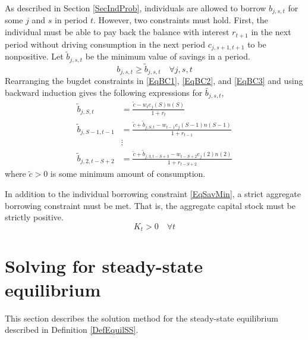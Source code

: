 \documentclass[letterpaper,12pt]{article}
\theoremstyle{definition}
\renewcommand\theenumi{\roman{enumi}}
\begin{document}
  As described in Section \ref{SecIndProb}, individuals are allowed to borrow $b_{j,s,t}$ for some $j$ and $s$ in period $t$. However, two constraints must hold. First, the individual must be able to pay back the balance with interest $r_{t+1}$ in the next period without driving consumption in the next period $c_{j,s+1,t+1}$ to be nonpositive. Let $\tilde{b}_{j,s,t}$ be the minimum value of savings in a period.
  \begin{equation}\label{EqSavMin}
    b_{j,s,t}\geq\tilde{b}_{j,s,t} \quad\forall j,s,t
  \end{equation}
  Rearranging the bugdet constraints in \eqref{EqBC1}, \eqref{EqBC2}, and \eqref{EqBC3} and using backward induction gives the following expressions for $\bar{b}_{j,s,t}$,
  \begin{equation}\label{EqBorConsts}
    \begin{split}
      \tilde{b}_{j,S,t} &= \frac{\tilde{c} - w_te_j(S)n(S)}{1+r_t}  \\
      \tilde{b}_{j,S-1,t-1} &= \frac{\tilde{c} + \tilde{b}_{j,S,t} - w_{t-1}e_j(S-1)n(S-1)}{1+r_{t-1}} \\
      &\vdots \\
      \tilde{b}_{j,2,t-S+2} &= \frac{\tilde{c} + \tilde{b}_{j,3,t-S+3} - w_{t-S+2}e_j(2)n(2)}{1+r_{t-S+2}}
    \end{split}
  \end{equation}
  where $\tilde{c}>0$ is some minimum amount of consumption.

  In addition to the individual borrowing constraint \eqref{EqSavMin}, a strict aggregate borrowing constraint must be met. That is, the aggregate capital stock must be strictly positive.
  \begin{equation}\label{EqAggrCapConstr}
    K_t > 0 \quad\forall t
  \end{equation}


\newpage
\section{Solving for steady-state equilibrium}\label{AppSSsolve}

  \setcounter{equation}{0}
  \renewcommand\theenumi{\arabic{enumi}}
  \renewcommand\theenumii{\alph{enumii}}
  \renewcommand\theenumiii{\roman{enumiii}}

  This section describes the solution method for the steady-state equilibrium described in Definition \ref{DefEquilSS}.
\end{document}

